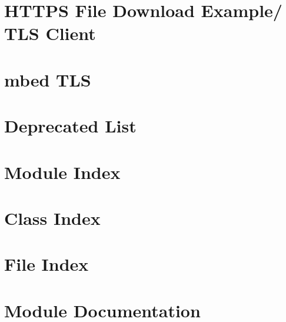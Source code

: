 \documentclass[twoside]{book}
\begin{document}
\chapter{H\-T\-T\-P\-S File Download Example/ T\-L\-S Client}
\label{md_C:_dev2_luambedtls_dependencies_mbedtls_yotta_data_example-tls-client_README}
\hypertarget{md_C:_dev2_luambedtls_dependencies_mbedtls_yotta_data_example-tls-client_README}{}

\chapter{mbed T\-L\-S}
\label{md_C:_dev2_luambedtls_dependencies_mbedtls_yotta_data_README}
\hypertarget{md_C:_dev2_luambedtls_dependencies_mbedtls_yotta_data_README}{}

\chapter{Deprecated List}
\label{deprecated}
\hypertarget{deprecated}{}

\chapter{Module Index}

\chapter{Class Index}

\chapter{File Index}

\chapter{Module Documentation}







\end{document}
